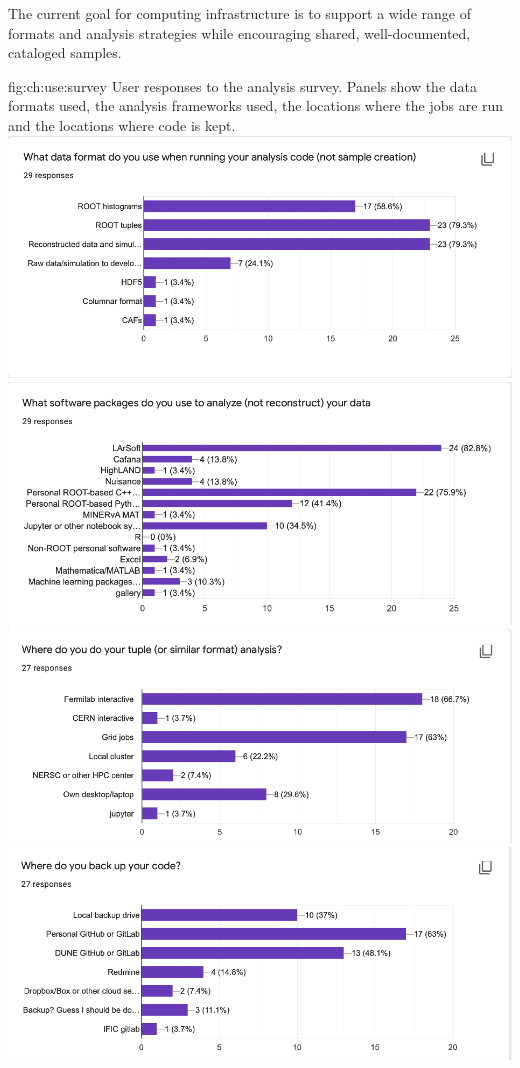 \documentclass[../main-v1.tex]{subfiles}
\begin{document}
The current goal for computing infrastructure is to support a wide range of formats and analysis strategies while encouraging shared, well-documented, cataloged samples. 

\begin{dunefigure}
{fig:ch:use:survey}
 {User responses to the analysis survey. Panels show the data formats used, the analysis frameworks used, the locations where the jobs are run and the locations where code is kept.}
\includegraphics[width=4 in]{graphics/Algo/SurveyFormat.png}
\includegraphics[width=4 in]{graphics/Algo/SurveyCode.png}
\includegraphics[width=4 in]{graphics/Algo/SurveySite.png}
\includegraphics[width=4 in]{graphics/Algo/SurveyRepo.png}
\end{dunefigure}
\end{document}
